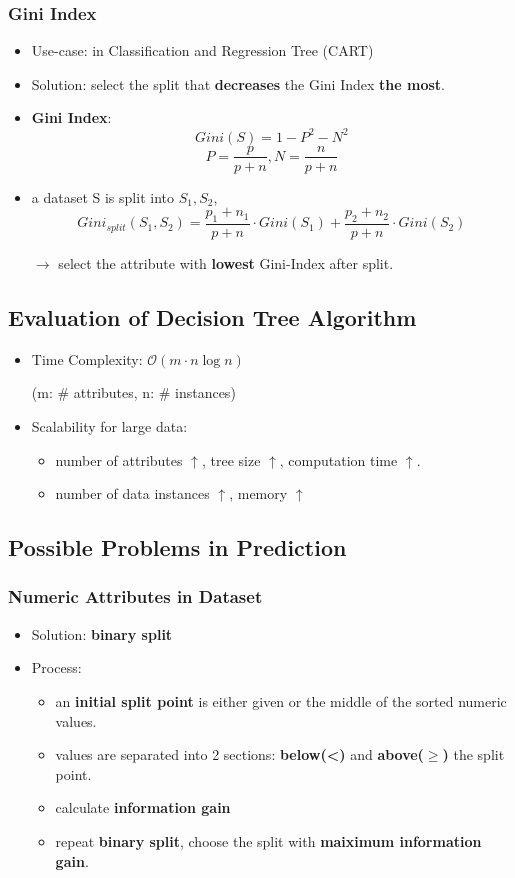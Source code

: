 \subsubsection{Gini Index}
\begin{itemize}
	\item Use-case: in Classification and Regression Tree (CART)
	\item Solution: select the split that \textbf{decreases} the Gini Index \textbf{the most}.
	\item \textbf{Gini Index}: 
	$$Gini(S) = 1 - P^2 - N^2$$
	$$P = \frac{p}{p+n}, N = \frac{n}{p+n}$$
	\item a dataset S is split into $S_1, S_2$, 
	$$Gini_{split} (S_1,S_2) = \frac{p_1 + n_1}{p+n} \cdot Gini(S_1) + \frac{p_2 + n_2}{p+n} \cdot Gini(S_2)$$
	
	$\rightarrow$ select the attribute with \textbf{lowest} Gini-Index after split.
\end{itemize}

\subsection{Evaluation of Decision Tree Algorithm}
\begin{itemize}
	\item Time Complexity: $\mathcal{O}(m\cdot n \log n)$
	
	(m: \# attributes, n: \# instances)
	\item Scalability for large data:
	\begin{itemize}
		\item number of attributes $\uparrow$, tree size $\uparrow$, computation time $\uparrow$.
		\item number of data instances $\uparrow$, memory $\uparrow$
	\end{itemize} 
\end{itemize}

\subsection{Possible Problems in Prediction}
\subsubsection{Numeric Attributes in Dataset}
\begin{itemize}
	\item Solution: \textbf{binary split}
	\item Process:
	\begin{itemize}
		\item an \textbf{initial split point} is either given or the middle of the sorted numeric values.
		\item values are separated into 2 sections: \textbf{below(<)} and \textbf{above($\geq$)} the split point.
		\item calculate \textbf{information gain}
		\item repeat \textbf{binary split}, choose the split with \textbf{maiximum information gain}. 
	\end{itemize}
\end{itemize}

